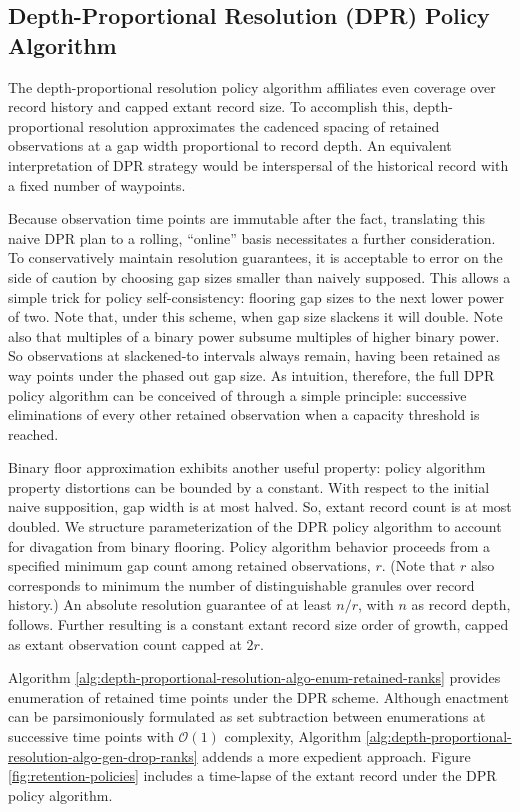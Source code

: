 \subsection{Depth-Proportional Resolution (DPR) Policy Algorithm}
\label{sec:depth-proportional-resolution-algo}

The depth-proportional resolution policy algorithm affiliates even coverage over record history and capped extant record size.
To accomplish this, depth-proportional resolution approximates the cadenced spacing of retained observations at a gap width proportional to record depth.
An equivalent interpretation of DPR strategy would be interspersal of the historical record with a fixed number of waypoints.

Because observation time points are immutable after the fact, translating this naive DPR plan to a rolling, ``online'' basis necessitates a further consideration.
To conservatively maintain resolution guarantees, it is acceptable to error on the side of caution by choosing gap sizes smaller than naively supposed.
This allows a simple trick for policy self-consistency: flooring gap sizes to the next lower power of two.
Note that, under this scheme, when gap size slackens it will double.
Note also that multiples of a binary power subsume multiples of higher binary power.
So observations at slackened-to intervals always remain, having been retained as way points under the phased out gap size.
As intuition, therefore, the full DPR policy algorithm can be conceived of through a simple principle: successive eliminations of every other retained observation when a capacity threshold is reached.

Binary floor approximation exhibits another useful property: policy algorithm property distortions can be bounded by a constant.
With respect to the initial naive supposition, gap width is at most halved.
So, extant record count is at most doubled.
We structure parameterization of the DPR policy algorithm to account for divagation from binary flooring.
Policy algorithm behavior proceeds from a specified minimum gap count among retained observations, $r$.
(Note that $r$ also corresponds to minimum the number of distinguishable granules over record history.)
An absolute resolution guarantee of at least $n/r$, with $n$ as record depth, follows.
Further resulting is a constant extant record size order of growth, capped as extant observation count capped at $2r$.

Algorithm \ref{alg:depth-proportional-resolution-algo-enum-retained-ranks} provides enumeration of retained time points under the DPR scheme.
Although enactment can be parsimoniously formulated as set subtraction between enumerations at successive time points with $\mathcal{O}(1)$ complexity, Algorithm \ref{alg:depth-proportional-resolution-algo-gen-drop-ranks} addends a more expedient approach.
Figure \ref{fig:retention-policies} includes a time-lapse of the extant record under the DPR policy algorithm.

